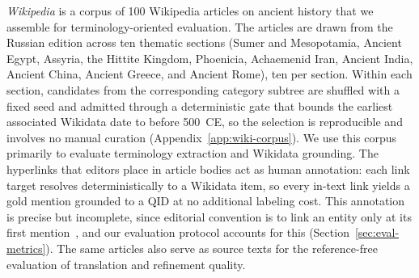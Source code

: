 
\textit{Wikipedia} is a corpus of 100 Wikipedia articles on ancient history
that we assemble for terminology-oriented evaluation. The articles are drawn
from the Russian edition across ten thematic sections (Sumer and Mesopotamia,
Ancient Egypt, Assyria, the Hittite Kingdom, Phoenicia, Achaemenid Iran,
Ancient India, Ancient China, Ancient Greece, and Ancient Rome), ten per
section. Within each section, candidates from the corresponding category
subtree are shuffled with a fixed seed and admitted through a deterministic
gate that bounds the earliest associated Wikidata date to before 500~CE, so
the selection is reproducible and involves no manual curation
(Appendix~\ref{app:wiki-corpus}). We use this corpus primarily to evaluate
terminology extraction and Wikidata grounding. The hyperlinks that editors
place in article bodies act as human annotation: each link target resolves
deterministically to a Wikidata item, so every in-text link yields a gold
mention grounded to a QID at no additional labeling cost. This annotation is
precise but incomplete, since editorial convention is to link an entity only
at its first mention~\citep{damuel2023}, and our evaluation protocol accounts
for this (Section~\ref{sec:eval-metrics}). The same articles also serve as
source texts for the reference-free evaluation of translation and refinement
quality.


